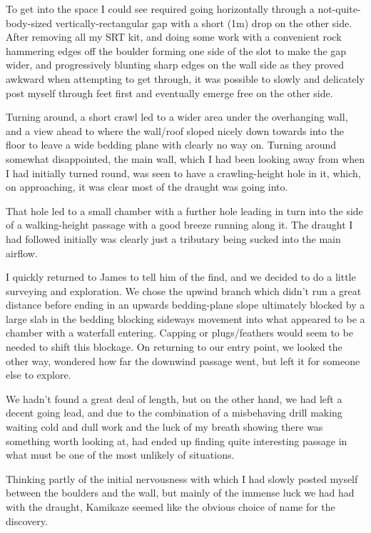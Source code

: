To get into the space I could see required going horizontally through a
not-quite-body-sized vertically-rectangular gap with a short (1m) drop
on the other side. After removing all my SRT kit, and doing some work
with a convenient rock hammering edges off the boulder forming one side
of the slot to make the gap wider, and progressively blunting sharp
edges on the wall side as they proved awkward when attempting to get
through, it was possible to slowly and delicately post myself through
feet first and eventually emerge free on the other side.

Turning around, a short crawl led to a wider area under the overhanging
wall, and a view ahead to where the wall/roof sloped nicely down towards
into the floor to leave a wide bedding plane with clearly no way on.
Turning around somewhat disappointed, the main wall, which I had been
looking away from when I had initially turned round, was seen to have a
crawling-height hole in it, which, on approaching, it was clear most of
the draught was going into.

That hole led to a small chamber with a further hole leading in turn
into the side of a walking-height passage with a good breeze running
along it. The draught I had followed initially was clearly just a
tributary being sucked into the main airflow.

I quickly returned to James to tell him of the find, and we decided to
do a little surveying and exploration. We chose the upwind branch which
didn't run a great distance before ending in an upwards bedding-plane
slope ultimately blocked by a large slab in the bedding blocking
sideways movement into what appeared to be a chamber with a waterfall
entering. Capping or plugs/feathers would seem to be needed to shift
this blockage. On returning to our entry point, we looked the other way,
wondered how far the downwind passage went, but left it for someone else
to explore.

We hadn't found a great deal of length, but on the other hand, we had
left a decent going lead, and due to the combination of a misbehaving
drill making waiting cold and dull work and the luck of my breath
showing there was something worth looking at, had ended up finding quite
interesting passage in what must be one of the most unlikely of
situations.

Thinking partly of the initial nervousness with which I had slowly
posted myself between the boulders and the wall, but mainly of the
immense luck we had had with the draught, Kamikaze seemed like the
obvious choice of name for the discovery.

